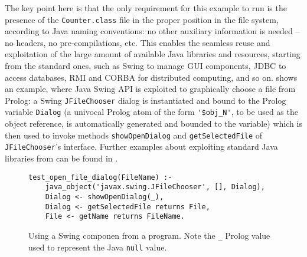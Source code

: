 The key point here is that the only requirement for this example
to run is the presence of the \texttt{Counter.class} file in the
proper position in the file system, according to Java naming
conventions: no other auxiliary information is needed -- no
headers, no pre-compilations, etc.
%
This enables the seamless reuse and exploitation of the large
amount of available Java libraries and resources, starting from
the standard ones, such as Swing to manage GUI components, JDBC to
access databases, RMI and CORBA for distributed computing, and so
on.
%
 shows an example, where Java Swing API is
exploited to graphically choose a file from Prolog: a Swing
\texttt{JFileChooser} dialog is instantiated and bound to the
Prolog variable \texttt{Dialog} (a univocal Prolog atom of the form
\verb|'$obj_N'|, to be
used as the object reference, is automatically generated and bounded
to the variable) which
is then used to invoke methods \texttt{showOpenDialog} and
\texttt{getSelectedFile} of \texttt{JFileChooser}'s interface.
%
Further examples about exploiting standard Java libraries from
\tuprolog{}
can be found in \cite{tuprolog-padl2001}.

\begin{figure}
\caption{Using a Swing componen from a \tuprolog{} program. Note the \texttt{\_} Prolog value used to represent the Java \texttt{null} value.
}
\begin{verbatim}
test_open_file_dialog(FileName) :-
    java_object('javax.swing.JFileChooser', [], Dialog),
    Dialog <- showOpenDialog(_),
    Dialog <- getSelectedFile returns File,
    File <- getName returns FileName.
\end{verbatim}
\end{figure}

